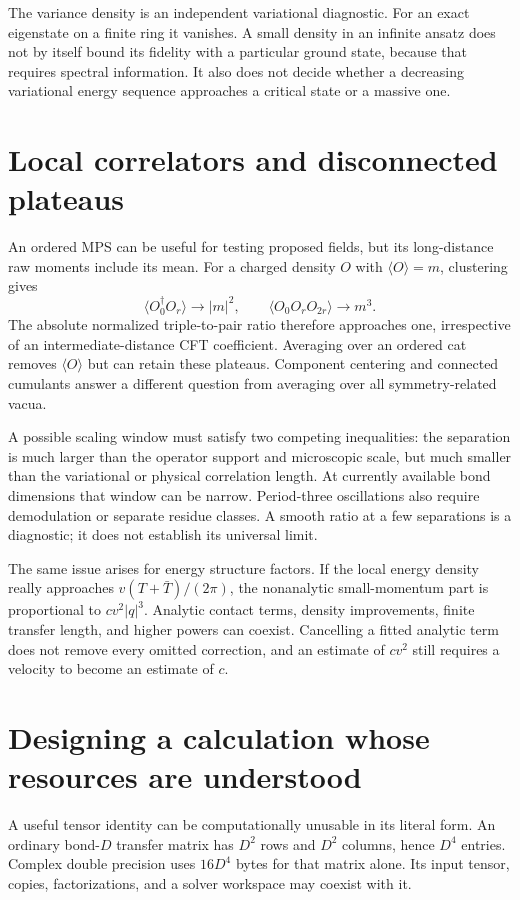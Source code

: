 The variance density is an independent variational diagnostic. For
an exact eigenstate on a finite ring it vanishes. A small density in
an infinite ansatz does not by itself bound its fidelity with a
particular ground state, because that requires spectral information.
It also does not decide whether a decreasing variational energy
sequence approaches a critical state or a massive one.

\section{Local correlators and disconnected plateaus}

An ordered MPS can be useful for testing proposed fields, but its
long-distance raw moments include its mean. For a charged density
$O$ with $\langle O\rangle=m$, clustering gives
\[
 \langle O_0^\dagger O_r\rangle\to|m|^2,\qquad
 \langle O_0O_rO_{2r}\rangle\to m^3.
\]
The absolute normalized triple-to-pair ratio therefore approaches one,
irrespective of an intermediate-distance CFT coefficient. Averaging
over an ordered cat removes $\langle O\rangle$ but can retain these
plateaus. Component centering and connected cumulants answer a
different question from averaging over all symmetry-related vacua.

A possible scaling window must satisfy two competing inequalities:
the separation is much larger than the operator support and
microscopic scale, but much smaller than the variational or physical
correlation length. At currently available bond dimensions that
window can be narrow. Period-three oscillations also require
demodulation or separate residue classes. A smooth ratio at a few
separations is a diagnostic; it does not establish its universal
limit.

The same issue arises for energy structure factors. If the local
energy density really approaches $v(T+\bar T)/(2\pi)$, the
nonanalytic small-momentum part is proportional to $cv^2|q|^3$.
Analytic contact terms, density improvements, finite transfer length,
and higher powers can coexist. Cancelling a fitted analytic term
does not remove every omitted correction, and an estimate of $cv^2$
still requires a velocity to become an estimate of $c$.

\section{Designing a calculation whose resources are understood}

A useful tensor identity can be computationally unusable in its
literal form. An ordinary bond-$D$ transfer matrix has $D^2$ rows and
$D^2$ columns, hence $D^4$ entries. Complex double precision uses
$16D^4$ bytes for that matrix alone. Its input tensor, copies,
factorizations, and a solver workspace may coexist with it.

